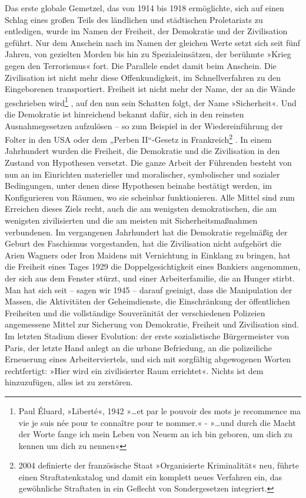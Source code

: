 
Das erste globale Gemetzel, das von 1914 bis 1918 ermöglichte, sich
auf einen Schlag eines großen Teils des ländlichen und städtischen
Proletariats zu entledigen, wurde im Namen der Freiheit, der
Demokratie und der Zivilisation geführt. Nur dem Anschein nach im
Namen der gleichen Werte setzt sich seit fünf Jahren, von gezielten
Morden bis hin zu Spezialeinsätzen, der berühmte »Krieg gegen den
Terrorismus« fort. Die Parallele endet damit beim Anschein. Die
Zivilisation ist nicht mehr diese Offenkundigkeit, im
Schnellverfahren zu den Eingeborenen transportiert. Freiheit ist
nicht mehr der Name, der an die Wände geschrieben wird\footnote{
Paul Éluard, »Liberté«, 1942 »\ldots{}et par le pouvoir des mots
\textbar{} je recommence ma vie \textbar{} je suis née pour te
connaître \textbar{} pour te nommer.« - »\ldots{}und durch die Macht der
Worte \textbar{} fange ich mein Leben von Neuem an \textbar{} ich
bin geboren, um dich zu kennen \textbar{} um dich zu nennen«
}%
, auf den
nun sein Schatten folgt, der Name »Sicherheit«. Und die Demokratie
ist hinreichend bekannt dafür, sich in den reinsten
Ausnahmegesetzen aufzulösen – so zum Beispiel in der
Wiedereinführung der Folter in den USA oder dem „Perben II“-Gesetz
in Frankreich\footnote{
2004 definierte der französische Staat »Organisierte
Kriminalität« neu, führte einen Straftatenkatalog und damit ein
komplett neues Verfahren ein, das gewöhnliche Straftaten in ein
Geflecht von Sondergesetzen integriert.
}%
.
In einem Jahrhundert wurden die Freiheit, die Demokratie und die
Zivilisation in den Zustand von Hypothesen versetzt. Die ganze
Arbeit der Führenden besteht von nun an im Einrichten materieller
und moralischer, symbolischer und sozialer Bedingungen, unter denen
diese Hypothesen beinahe bestätigt werden, im Konfigurieren von
Räumen, wo sie scheinbar funktionieren. Alle Mittel sind zum
Erreichen dieses Ziels recht, auch die am wenigsten demokratischen,
die am wenigsten zivilisierten und die am meisten mit
Sicherheitsmaßnahmen verbundenen. Im vergangenen Jahrhundert hat
die Demokratie regelmäßig der Geburt des Faschismus vorgestanden,
hat die Zivilisation nicht aufgehört die Arien Wagners oder Iron
Maidens mit Vernichtung in Einklang zu bringen, hat die Freiheit
eines Tages 1929 die Doppelgesichtigkeit eines Bankiers angenommen,
der sich aus dem Fenster stürzt, und einer Arbeiterfamilie, die an
Hunger stirbt. Man hat sich seit – sagen wir 1945 – darauf
geeinigt, dass die Manipulation der Massen, die Aktivitäten der
Geheimdienste, die Einschränkung der öffentlichen Freiheiten und
die vollständige Souveränität der verschiedenen Polizeien
angemessene Mittel zur Sicherung von Demokratie, Freiheit und
Zivilisation sind. Im letzten Stadium dieser Evolution: der erste
sozialistische Bürgermeister von Paris, der letzte Hand anlegt an
die urbane Befriedung, an die polizeiliche Erneuerung eines
Arbeiterviertels, und sich mit sorgfältig abgewogenen Worten
rechtfertigt: »Hier wird ein zivilisierter Raum errichtet«. Nichts
ist dem hinzuzufügen, alles ist zu zerstören.

